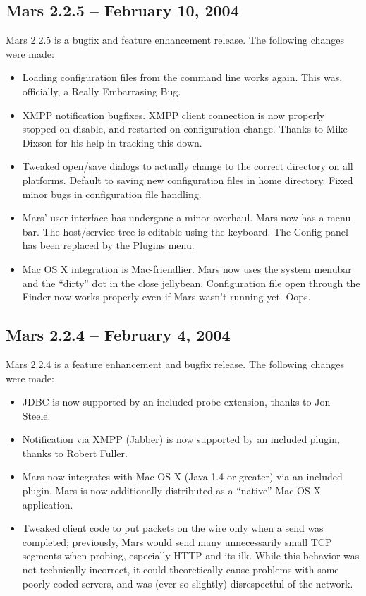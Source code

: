 \documentclass{article}
\begin{document}
\subsection{Mars 2.2.5 -- February 10, 2004}
Mars 2.2.5 is a bugfix and feature enhancement release. The following
changes were made:
\begin{itemize}
\item Loading configuration files from the command line works
  again. This was, officially, a Really Embarrasing Bug.
\item XMPP notification bugfixes. XMPP client connection is now
  properly stopped on disable, and restarted on configuration
  change. Thanks to Mike Dixson for his help in tracking this down.
\item Tweaked open/save dialogs to actually change to the correct
  directory on all platforms. Default to saving new configuration
  files in home directory. Fixed minor bugs in configuration file
  handling.
\item Mars' user interface has undergone a minor overhaul. Mars now
  has a menu bar. The host/service tree is editable using the
  keyboard. The Config panel has been replaced by the Plugins menu.
\item Mac OS X integration is Mac-friendlier. Mars now uses the system
  menubar and the ``dirty'' dot in the close jellybean. Configuration
  file open through the Finder now works properly even if Mars wasn't
  running yet. Oops.
\end{itemize}

\subsection{Mars 2.2.4 -- February 4, 2004}
Mars 2.2.4 is a feature enhancement and bugfix release. The following
changes were made:
\begin{itemize}
\item JDBC is now supported by an included probe extension, thanks to
  Jon Steele.
\item Notification via XMPP (Jabber) is now supported by an included
  plugin, thanks to Robert Fuller.
\item Mars now integrates with Mac OS X (Java 1.4 or greater) via an
  included plugin. Mars is now additionally distributed as a
  ``native'' Mac OS X application.
\item Tweaked client code to put packets on the wire only when a send
  was completed; previously, Mars would send many unnecessarily small
  TCP segments when probing, especially HTTP and its ilk. While this
  behavior was not technically incorrect, it could theoretically cause
  problems with some poorly coded servers, and was (ever so slightly)
  disrespectful of the network.
\end{itemize}
\end{document}
